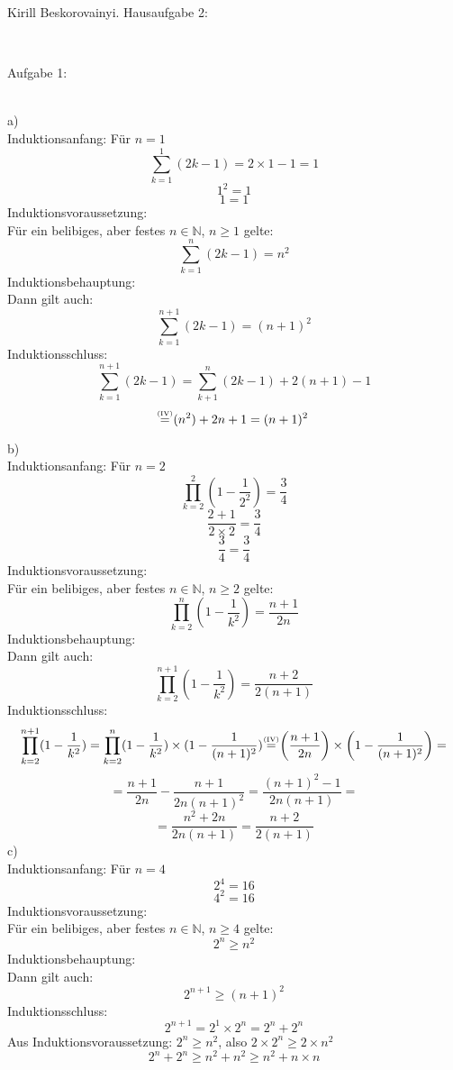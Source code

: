\documentclass[11pt]{article}
\newcommand\myeq{\stackrel{\mathclap{\normalfont{\tiny\mbox{(IV)}}}}{=}}
\begin{document}
	\noindent \begin{huge}Kirill Beskorovainyi. Hausaufgabe 2:\end{huge}\\\vspace{0.05in}

		\noindent \begin{Large}Aufgabe 1:\end{Large}\\[2pt]
			\indent a)\\
				Induktionsanfang: Für $n=1$
					$$\sum\limits_{k=1}^1 (2k-1)=2 \times 1 - 1 = 1$$
					$$1^2=1$$
					$$1 = 1$$
				Induktionsvoraussetzung:\\
				Für ein belibiges, aber festes $n \in \mathbb{N}$, $n \geq 1$ gelte:
					$$\sum\limits_{k=1}^n(2k-1)=n^2$$
				Induktionsbehauptung:\\
				Dann gilt auch:
				$$\sum \limits_{k=1}^{n+1}(2k-1)=(n+1)^2$$
				Induktionsschluss: \\
					$$\sum\limits_{k=1}^{n+1}(2k-1)=\sum\limits_{k+1}^{n}(2k-1)+2(n+1)-1$$
					$$\myeq(n^2)+2n+1 = (n+1)^2$$

			\indent b)\\
				Induktionsanfang: Für $n=2$
					$$\prod\limits_{k=2}^2(1-\frac{1}{2^2})=\frac{3}{4}$$
					$$\frac{2+1}{2\times2}=\frac{3}{4}$$
					$$\frac{3}{4}=\frac{3}{4}$$
				Induktionsvoraussetzung:\\
				Für ein belibiges, aber festes $n \in \mathbb{N}$, $n \geq 2$ gelte:
					$$\prod\limits_{k=2}^n(1-\frac{1}{k^2})=\frac{n+1}{2n}$$
				Induktionsbehauptung:\\
				Dann gilt auch:
					$$\prod\limits_{k=2}^{n+1}(1-\frac{1}{k^2})=\frac{n+2}{2(n+1)}$$
				Induktionsschluss: \\
					$$\prod\limits_{k=2}^{n+1}(1-\frac{1}{k^2})=\prod\limits_{k=2}^n(1-\frac{1}{k^2})\times(1-\frac{1}{(n+1)^2})\myeq\left(\frac{n+1}{2n}\right)\times\left(1-\frac{1}{(n+1)^2}\right)=$$
					$$=\frac{n+1}{2n}-\frac{n+1}{2n(n+1)^2}=\frac{(n+1)^2-1}{2n(n+1)}=$$
					$$=\frac{n^2+2n}{2n(n+1)}=\frac{n+2}{2(n+1)}$$
			\indent c)\\
				Induktionsanfang: Für $n=4$
					$$2^4 = 16$$
					$$4^2 = 16$$
				Induktionsvoraussetzung:\\
				Für ein belibiges, aber festes $n \in \mathbb{N}$, $n \geq 4$ gelte:
					$$2^n \geq n^2$$
				Induktionsbehauptung:\\
				Dann gilt auch:
					$$2^{n+1}\geq (n+1)^2$$
				Induktionsschluss: \\
					$$2^{n+1}=2^1 \times 2^n=2^n+2^n$$
					Aus Induktionsvoraussetzung: $2^n \geq n^2$, also $2 \times 2^n \geq 2 \times n^2$
					$$2^n+2^n \geq n^2+n^2 \geq n^2+n \times n$$
					
\end{document}
